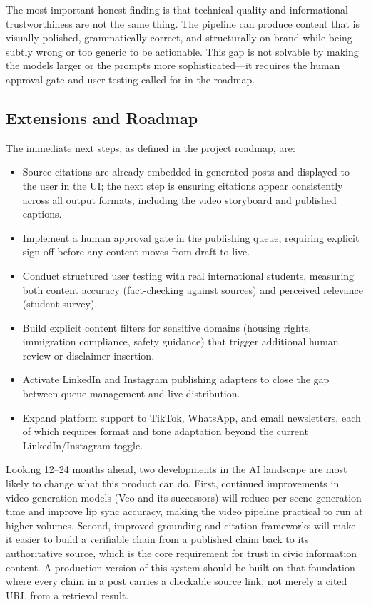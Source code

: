 \documentclass[12pt, letterpaper]{article}
\begin{document}
The most important honest finding is that technical quality and informational trustworthiness
are not the same thing. The pipeline can produce content that is visually polished,
grammatically correct, and structurally on-brand while being subtly wrong or too
generic to be actionable. This gap is not solvable by making the models larger or the
prompts more sophisticated---it requires the human approval gate and user testing called
for in the roadmap.

\subsection{Extensions and Roadmap}

The immediate next steps, as defined in the project roadmap, are:

\begin{itemize}[leftmargin=1.5em]
  \item Source citations are already embedded in generated posts and displayed to the
    user in the UI; the next step is ensuring citations appear consistently across all
    output formats, including the video storyboard and published captions.
  \item Implement a human approval gate in the publishing queue, requiring explicit
    sign-off before any content moves from draft to live.
  \item Conduct structured user testing with real international students, measuring
    both content accuracy (fact-checking against sources) and perceived relevance
    (student survey).
  \item Build explicit content filters for sensitive domains (housing rights,
    immigration compliance, safety guidance) that trigger additional human review or
    disclaimer insertion.
  \item Activate LinkedIn and Instagram publishing adapters to close the gap between
    queue management and live distribution.
  \item Expand platform support to TikTok, WhatsApp, and email newsletters, each of
    which requires format and tone adaptation beyond the current LinkedIn/Instagram toggle.
\end{itemize}

Looking 12--24 months ahead, two developments in the AI landscape are most likely to
change what this product can do. First, continued improvements in video generation
models (Veo and its successors) will reduce per-scene generation time and improve lip
sync accuracy, making the video pipeline practical to run at higher volumes. Second,
improved grounding and citation frameworks will make it easier to build a verifiable
chain from a published claim back to its authoritative source, which is the core
requirement for trust in civic information content. A production version of this system
should be built on that foundation---where every claim in a post carries a checkable
source link, not merely a cited URL from a retrieval result.
\end{document}
